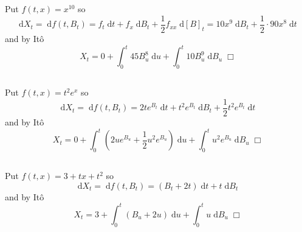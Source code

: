 \documentclass{article}
\begin{document}
\subsection{}
Put $f(t,x) = x^{10}$ so
$$\mathrm{d}X_t = \;\mathrm{d}f(t,B_t) = f_t \;\mathrm{d}t + f_x \;\mathrm{d}B_t + \frac{1}{2}f_{xx} \;\mathrm{d}[B]_t = 10x^9 \;\mathrm{d}B_t + \frac{1}{2}\cdot 90 x^8 \;\mathrm{d}t$$
and by It\^o
$$X_t = 0 + \int_0^t 45B_u^8 \;\mathrm{d}u + \int_0^t 10B_u^9 \;\mathrm{d}B_u \; \Box$$

\subsection{}
Put $f(t,x) = t^2e^x$ so
$$\mathrm{d}X_t = \;\mathrm{d}f(t,B_t) = 2te^{B_t} \;\mathrm{d}t + t^2e^{B_t} \;\mathrm{d}B_t + \frac{1}{2} t^2e^{B_t} \;\mathrm{d}t$$
and by It\^o
$$X_t = 0 + \int_0^t \left( 2ue^{B_u} + \frac{1}{2}u^2e^{B_u} \right) \;\mathrm{d}u + \int_0^t u^2e^{B_u} \;\mathrm{d}B_u \; \Box$$

\subsection{}
Put $f(t,x) = 3 + tx + t^2$ so
$$\mathrm{d}X_t = \;\mathrm{d}f(t,B_t) = (B_t + 2t) \;\mathrm{d}t + t \;\mathrm{d}B_t$$
and by It\^o
$$X_t = 3 + \int_0^t \left( B_u + 2u \right) \;\mathrm{d}u + \int_0^t u \;\mathrm{d}B_u \; \Box$$
\end{document}
